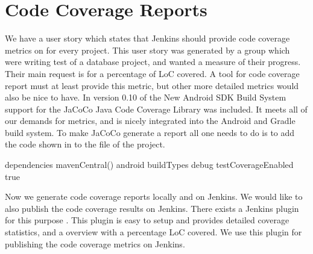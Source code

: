 \section{Code Coverage Reports}

We have a user story which states that Jenkins should provide code coverage metrics on for every project. This user story was generated by a group which were writing test of a database project, and wanted a measure of their progress. Their main request is for a percentage of LoC covered. A tool for code coverage report must at least provide this metric, but other more detailed metrics would also be nice to have. In version 0.10 of the New Android SDK Build System \parencite{new-build-android} support for the JaCoCo \parencite{jacoco-home} Java Code Coverage Library was included. It meets all of our demands for metrics, and is nicely integrated into the Android and Gradle build system. 
To make JaCoCo generate a report all one needs to do is to add the code shown in  to the  file of the project. 
\begin{gradlecode}[caption=Gradle script for enabling JaCoCo,label=lst:Jacoco]
dependencies {
    mavenCentral()
}
android {
    buildTypes {
        debug {
            testCoverageEnabled true
        }
    }
}
\end{gradlecode}{}
Now we generate code coverage reports locally and on Jenkins. We would like to also publish the code coverage results on Jenkins. There exists a Jenkins plugin for this purpose \parencite{jacoco-jenkins-plugin}. This plugin is easy to setup and provides detailed coverage statistics, and a overview with a percentage LoC covered. We use this plugin for publishing the code coverage metrics on Jenkins.
